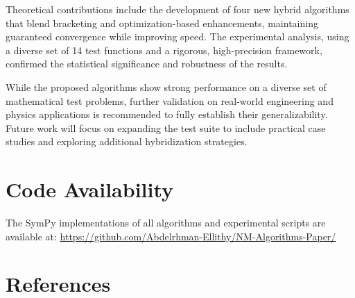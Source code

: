 \documentclass[amsmath, amssymb, aps]{revtex4-2}
\begin{document}
Theoretical contributions include the development of four new hybrid algorithms that blend bracketing and optimization-based enhancements, maintaining guaranteed convergence while improving speed. The experimental analysis, using a diverse set of 14 test functions and a rigorous, high-precision framework, confirmed the statistical significance and robustness of the results.

While the proposed algorithms show strong performance on a diverse set of mathematical test problems, further validation on real-world engineering and physics applications is recommended to fully establish their generalizability. Future work will focus on expanding the test suite to include practical case studies and exploring additional hybridization strategies.

\section*{Code Availability}
The SymPy implementations of all algorithms and experimental scripts are available at: \url{https://github.com/Abdelrhman-Ellithy/NM-Algorithms-Paper/}

\section*{References}
\end{document}
